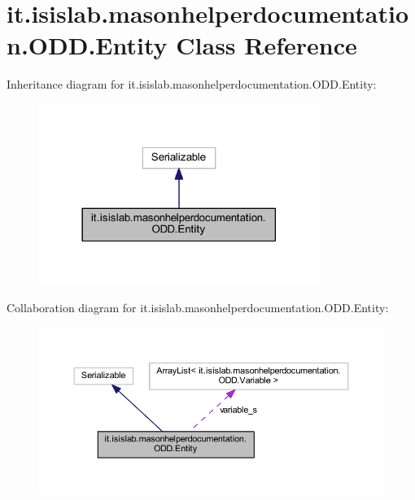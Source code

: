 \hypertarget{classit_1_1isislab_1_1masonhelperdocumentation_1_1_o_d_d_1_1_entity}{\section{it.\-isislab.\-masonhelperdocumentation.\-O\-D\-D.\-Entity Class Reference}
\label{classit_1_1isislab_1_1masonhelperdocumentation_1_1_o_d_d_1_1_entity}
}


Inheritance diagram for it.\-isislab.\-masonhelperdocumentation.\-O\-D\-D.\-Entity\-:\nopagebreak
\begin{figure}[H]
\begin{center}
\leavevmode
\includegraphics[width=258pt]{classit_1_1isislab_1_1masonhelperdocumentation_1_1_o_d_d_1_1_entity__inherit__graph}
\end{center}
\end{figure}


Collaboration diagram for it.\-isislab.\-masonhelperdocumentation.\-O\-D\-D.\-Entity\-:\nopagebreak
\begin{figure}[H]
\begin{center}
\leavevmode
\includegraphics[width=350pt]{classit_1_1isislab_1_1masonhelperdocumentation_1_1_o_d_d_1_1_entity__coll__graph}
\end{center}
\end{figure}
